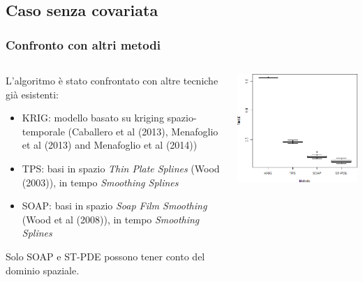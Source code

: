 \documentclass[landscape,9pt]{beamer}                           %
\begin{document}
\subsection{Caso senza covariata}
\begin{frame}
\frametitle{Confronto con altri metodi}
\begin{columns}
	\begin{column}{0.6\textwidth}
	L'algoritmo è stato confrontato con altre tecniche già esistenti:
	\begin{itemize}
	\item<2-> KRIG: modello basato su kriging spazio-temporale (Caballero et al (2013),
Menafoglio et al (2013) and Menafoglio et al (2014))
	\item<3-> TPS: basi in spazio \textit{Thin Plate Splines} (Wood (2003)), in tempo \textit{Smoothing Splines}
	\item<4-> SOAP: basi in spazio \textit{Soap Film Smoothing} (Wood et al (2008)), in tempo \textit{Smoothing Splines} 
	\end{itemize}
	{Solo SOAP e ST-PDE possono tener conto del dominio spaziale.}
	\end{column}
	\begin{column}{0.4\textwidth}
	\uncover<6->
	{\begin{flushright}
		\includegraphics[width=1\textwidth]{Immagini/Confronto_metodi.png}
	\end{flushright}}		
	\end{column}
\end{columns}
\end{frame}
\end{document}

